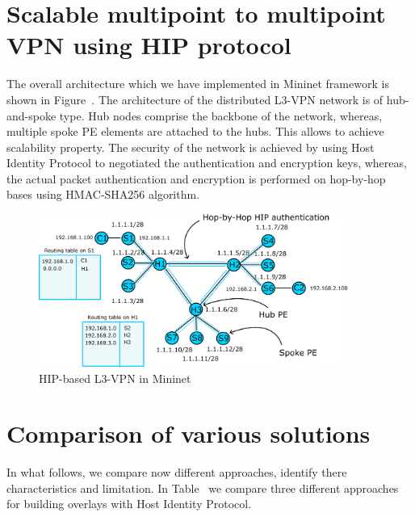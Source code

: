 

\section{Scalable multipoint to multipoint VPN using HIP protocol}

The overall architecture which we have implemented in
Mininet framework is shown in Figure~\cite{fig:l3vpn}. The architecture
of the distributed L3-VPN network is of hub-and-spoke type.
Hub nodes comprise the backbone of the network, whereas,
multiple spoke PE elements are attached to the hubs. This
allows to achieve scalability property. The security of the 
network is achieved by using Host Identity Protocol to negotiated
the authentication and encryption keys, whereas, the actual packet authentication
and encryption is performed on hop-by-hop bases using HMAC-SHA256
algorithm. 

\begin{figure}[h!]
    \centering
    \includegraphics[width=0.9\textwidth]{graphics/arch.png}
    \caption{HIP-based L3-VPN in Mininet}
    \label{fig:l3vpn}
\end{figure}

\section{Comparison of various solutions}

In what follows, we compare now different approaches, identify there
characteristics and limitation. In Table~\cite{tab:analysis} we 
compare three different approaches for building overlays with Host 
Identity Protocol. 

